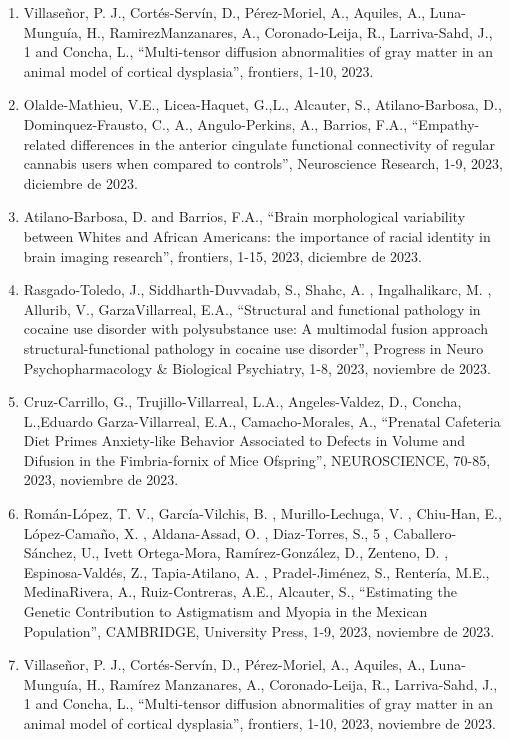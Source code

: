 \begin{enumerate}
\item Villaseñor, P. J., Cortés-Servín, D., Pérez-Moriel, A., Aquiles, A., Luna-Munguía, H., 
RamirezManzanares, A., Coronado-Leija, R., Larriva-Sahd, J., 1 and Concha, L., “Multi-tensor 
diffusion abnormalities of gray matter in an animal model of cortical dysplasia”, frontiers, 1-10, 
2023.

\item Olalde-Mathieu, V.E., Licea-Haquet, G.,L., Alcauter, S., Atilano-Barbosa, D., Dominquez-Frausto, C., A., Angulo-Perkins, A., Barrios, F.A., 
“Empathy-related 
differences in the anterior cingulate functional connectivity of regular cannabis users when compared to controls”, Neuroscience Research, 1-9, 2023,  
diciembre de 2023.

\item Atilano-Barbosa, D. and Barrios, F.A., “Brain morphological variability between Whites and African Americans: the importance of racial identity in brain 
imaging research”, frontiers, 1-15, 2023,  diciembre de 2023.

\item Rasgado-Toledo, J., Siddharth-Duvvadab, S., Shahc, A. , Ingalhalikarc, M. , Allurib, V., GarzaVillarreal, E.A., “Structural and functional pathology in 
cocaine use disorder with polysubstance use: A multimodal fusion approach structural-functional pathology in cocaine use disorder”, Progress in Neuro 
Psychopharmacology \& Biological Psychiatry, 1-8, 2023,  noviembre de 2023.

\item Cruz-Carrillo, G., Trujillo-Villarreal, L.A., Angeles-Valdez, D., Concha, L.,Eduardo Garza-Villarreal, E.A., Camacho-Morales, A., “Prenatal Cafeteria Diet 
Primes Anxiety-like Behavior Associated to Defects in Volume and Difusion in the Fimbria-fornix of Mice Ofspring”, NEUROSCIENCE, 70-85, 2023,  noviembre de 
2023.

\item Román-López, T. V., García-Vilchis, B. , Murillo-Lechuga, V. , Chiu-Han, E., López-Camaño, X. , Aldana-Assad, O. , Diaz-Torres, S., 5 , Caballero-Sánchez, 
U., Ivett Ortega-Mora, Ramírez-González, D., Zenteno, D. , Espinosa-Valdés, Z., Tapia-Atilano, A. , Pradel-Jiménez, S., Rentería, M.E., MedinaRivera, A., 
Ruiz-Contreras, A.E., Alcauter, S., “Estimating the Genetic Contribution to Astigmatism and Myopia in the Mexican Population”, CAMBRIDGE, University Press, 
1-9, 2023,  noviembre de 2023.

\item Villaseñor, P. J., Cortés-Servín, D., Pérez-Moriel, A., Aquiles, A., Luna-Munguía, H., Ramírez Manzanares, A., Coronado-Leija, R., Larriva-Sahd, J., 1 and 
Concha, L., “Multi-tensor diffusion abnormalities of gray matter in an animal model of cortical dysplasia”, frontiers, 1-10, 2023,  noviembre de 2023.


\end{enumerate}
